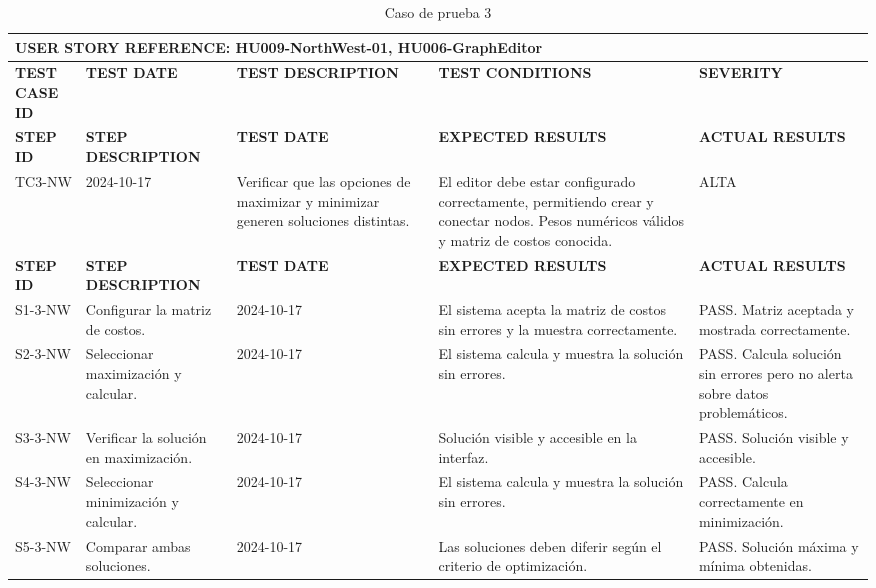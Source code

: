 \begin{longtable}{|p{2cm}|p{3cm}|p{3cm}|p{3cm}|p{3cm}|}
    \caption{Caso de prueba 3} \label{tab:casos_prueba3} \\
    \hline
    \multicolumn{5}{|l|}{\textbf{USER STORY REFERENCE: HU009-NorthWest-01, HU006-GraphEditor}} \\ \hline
    \textbf{TEST CASE ID} & \textbf{TEST DATE} & \textbf{TEST DESCRIPTION} & \textbf{TEST CONDITIONS} & \textbf{SEVERITY } \\ \hline
    \endfirsthead
    \hline
    \textbf{STEP ID} & \textbf{STEP DESCRIPTION} & \textbf{TEST DATE} & \textbf{EXPECTED RESULTS} & \textbf{ACTUAL RESULTS} \\ \hline
    \endhead
    TC3-NW & 2024-10-17 & Verificar que las opciones de maximizar y minimizar generen soluciones distintas. & El editor debe estar configurado correctamente, permitiendo crear y conectar nodos. Pesos numéricos válidos y matriz de costos conocida. & ALTA \\ \hline
    \textbf{STEP ID} & \textbf{STEP DESCRIPTION} & \textbf{TEST DATE} & \textbf{EXPECTED RESULTS} & \textbf{ACTUAL RESULTS} \\ \hline
    S1-3-NW & Configurar la matriz de costos. & 2024-10-17 & El sistema acepta la matriz de costos sin errores y la muestra correctamente. & PASS. Matriz aceptada y mostrada correctamente. \\ \hline
    S2-3-NW & Seleccionar maximización y calcular. & 2024-10-17 & El sistema calcula y muestra la solución sin errores. & PASS. Calcula solución sin errores pero no alerta sobre datos problemáticos. \\ \hline
    S3-3-NW & Verificar la solución en maximización. & 2024-10-17 & Solución visible y accesible en la interfaz. & PASS. Solución visible y accesible. \\ \hline
    S4-3-NW & Seleccionar minimización y calcular. & 2024-10-17 & El sistema calcula y muestra la solución sin errores. & PASS. Calcula correctamente en minimización. \\ \hline
    S5-3-NW & Comparar ambas soluciones. & 2024-10-17 & Las soluciones deben diferir según el criterio de optimización. & PASS. Solución máxima y mínima obtenidas. \\ \hline
\end{longtable}

